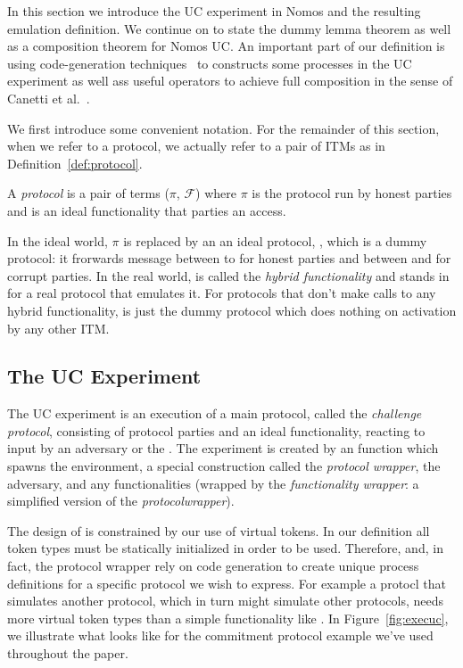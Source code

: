 In this section we introduce the UC experiment in Nomos and the resulting emulation definition.
We continue on to state the dummy lemma theorem as well as a composition theorem for Nomos UC.
An important part of our definition is using code-generation techniques~\cite{somecodegeneration} to constructs some processes in the UC experiment as well ass useful operators to achieve full composition in the sense of Canetti et al.~\cite{uc}.


We first introduce some convenient notation.
For the remainder of this section, when we refer to a protocol, we actually refer to a pair of ITMs as in Definition~\ref{def:protocol}.
\begin{definition}\label{def:protocol}
A \textit{protocol} is a pair of terms ($\pi$, $\mathcal{F}$) where $\pi$ is the protocol run by honest parties and \F is an ideal functionality that parties an access.
\end{definition}
In the ideal world, $\pi$ is replaced by an an ideal protocol, \idealP, which is a dummy protocol: it frorwards message between \Environment to \F for honest parties  and between \Adversary and \F for corrupt parties.
In the real world, \F is called the \textit{hybrid functionality} and stands in for a real protocol that emulates it.
For protocols that don't make calls to any hybrid functionality, \F is just the dummy protocol which does nothing on activation by any other ITM.

\subsection{The UC Experiment}
The UC experiment is an execution of a main protocol, called the \textit{challenge protocol}, consisting of protocol parties and an ideal functionality, reacting to input by an adversary \Adversary or the \Environment.
The experiment is created by an  function which spawns the environment, a special construction called the \textit{protocol wrapper}, the adversary, and any functionalities (wrapped by the \textit{functionality wrapper}: a simplified version of the \textit{protocolwrapper}).

The design of  is constrained by our use of virtual tokens.
In our definition all token types must be statically initialized in order to be used.
Therefore,  and, in fact, the protocol wrapper rely on code generation to create unique process definitions for a specific protocol we wish to express.
For example a protocl that simulates another protocol, which in turn might simulate other protocols, needs more virtual token types than a simple functionality like \Fcom.
In Figure~\ref{fig:execuc}, we illustrate what  looks like for the commitment protocol example we've used throughout the paper.

